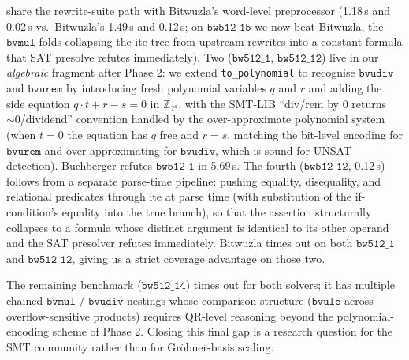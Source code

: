 \documentclass[runningheads]{llncs}
\begin{document}
share the rewrite-suite path with Bitwuzla's word-level
preprocessor (1.18\,s and 0.02\,s vs.\ Bitwuzla's 1.49\,s and
0.12\,s; on $\mathtt{bw512\_15}$ we now beat Bitwuzla, the
$\mathtt{bvmul}$ folds collapsing the ite tree from upstream
rewrites into a constant formula that SAT presolve refutes
immediately). Two ($\mathtt{bw512\_1}$, $\mathtt{bw512\_12}$)
live in our \emph{algebraic} fragment after Phase 2: we extend
\texttt{to\_polynomial} to recognise $\mathtt{bvudiv}$ and
$\mathtt{bvurem}$ by introducing fresh polynomial variables
$q$ and $r$ and adding the side equation
$q \cdot t + r - s = 0$ in $\mathbb{Z}_{2^d}$, with the SMT-LIB
``div/rem by 0 returns ${\sim}0$/dividend'' convention handled
by the over-approximate polynomial system (when $t = 0$ the
equation has $q$ free and $r = s$, matching the bit-level
encoding for $\mathtt{bvurem}$ and over-approximating for
$\mathtt{bvudiv}$, which is sound for UNSAT detection).
Buchberger refutes $\mathtt{bw512\_1}$ in 5.69\,s. The fourth
($\mathtt{bw512\_12}$, 0.12\,s) follows from a separate
parse-time pipeline: pushing equality, disequality, and
relational predicates through ite at parse time (with
substitution of the if-condition's equality into the true
branch), so that the assertion structurally collapses to a
formula whose distinct argument is identical to its other
operand and the SAT presolver refutes immediately. Bitwuzla
times out on both $\mathtt{bw512\_1}$ and $\mathtt{bw512\_12}$,
giving us a strict coverage advantage on those two.

The remaining benchmark ($\mathtt{bw512\_14}$) times out for
both solvers; it has multiple chained $\mathtt{bvmul}$ /
$\mathtt{bvudiv}$ nestings whose comparison structure
($\mathtt{bvule}$ across overflow-sensitive products) requires
QR-level reasoning beyond the polynomial-encoding scheme of
Phase 2. Closing this final gap is a research question for the
SMT community rather than for Gr\"obner-basis scaling.
\end{document}
